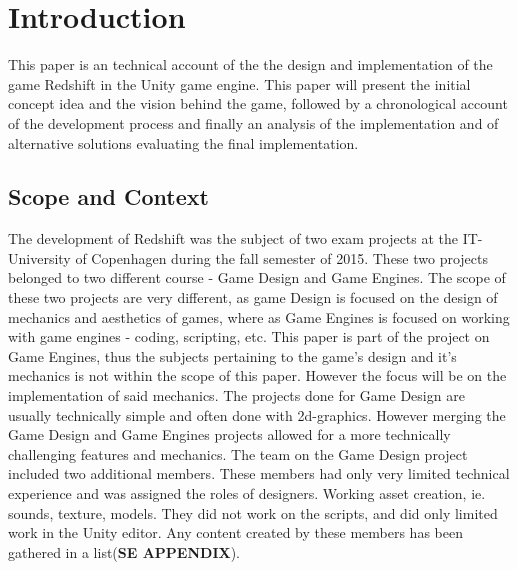 \section{Introduction}
 This paper is an technical account of the the design and implementation of the game Redshift in the Unity game engine. This paper will present the initial concept idea and the vision behind the game, followed by a chronological account of the development process and finally an analysis of the implementation and of alternative solutions evaluating the final implementation.
\subsection{Scope and Context}
The development of Redshift was the subject of two exam projects at the IT-University of Copenhagen during the fall semester of 2015.
These two projects belonged to two different course - Game Design and Game Engines.
The scope of these two projects are very different, as game Design is focused on the design of mechanics and aesthetics of games, where as Game Engines is focused on working with game engines - coding, scripting, etc.
This paper is part of the project on Game Engines, thus the subjects pertaining to the game's design and it's mechanics is not within the scope of this paper. However the focus will be on the implementation of said mechanics.
The projects done for Game Design are usually technically simple and often done with 2d-graphics. However merging the Game Design and Game Engines projects allowed for a more technically challenging features and mechanics.
The team on the Game Design project included two additional members. These members had only very limited technical experience and was assigned the roles of designers. Working asset creation, ie. sounds, texture, models. They did not work on the scripts, and did only limited work in the Unity editor. Any content created by these members has been gathered in a list(\textbf{SE APPENDIX}).



